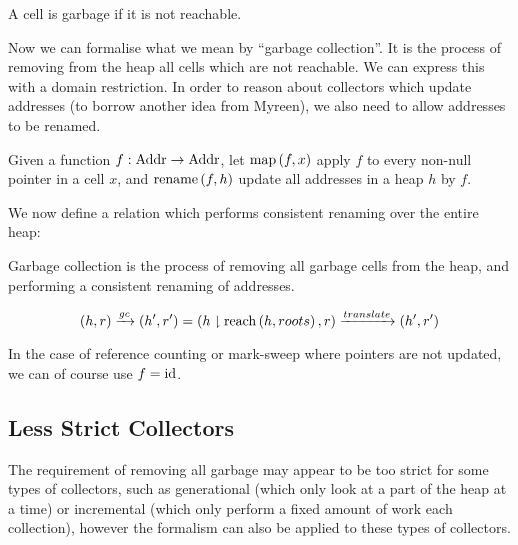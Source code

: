 \begin{definition}[Garbage]
  A cell is garbage if it is not reachable.

  \begin{prooftree}
  \end{prooftree}
\end{definition}

Now we can formalise what we mean by ``\gls{garbage collection}''. It
is the process of removing from the heap all \glspl{cell} which are
not reachable. We can express this with a domain
restriction. In order to reason about \glspl{collector} which update
addresses (to borrow another idea from Myreen), we also need to allow
addresses to be renamed.

\begin{definition}[Translation]
  Given a function $f : \addr \to \addr$, let $\map{f}{x}$ apply $f$
  to every non-null pointer in a cell $x$, and $\rename{f}{h}$ update
  all addresses in a heap $h$ by $f$.

  We now define a relation which performs consistent renaming over the
  entire heap:

  \begin{prooftree}
  \end{prooftree}
\end{definition}

\begin{definition}
  Garbage collection is the process of removing all garbage cells from
  the heap, and performing a consistent renaming of addresses.

  \[(h, r) \gc (h', r') = (h \restrict \reach{h}{roots}, r) \translate
  (h', r')\]
\end{definition}

In the case of \gls{reference counting} or \gls{mark-sweep} where
\glspl{pointer} are not updated, we can of course use $f = \id$.

\subsection{Less Strict Collectors}

The requirement of removing all \gls{garbage} may appear to be too
strict for some types of collectors, such as generational (which only
look at a part of the heap at a time) or incremental (which only
perform a fixed amount of work each collection), however the formalism
can also be applied to these types of collectors.

